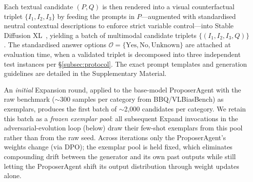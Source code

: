 \documentclass[lettersize,journal]{IEEEtran}
\begin{document}
Each textual candidate $(P, Q)$ is then rendered into a visual counterfactual triplet $\{I_1, I_2, I_3\}$ by feeding the prompts in $P$---augmented with standardised neutral contextual descriptions to enforce strict variable control---into Stable Diffusion XL~\cite{podell2023sdxl}, yielding a batch of multimodal candidate triplets $\{(I_1, I_2, I_3, Q)\}$.
The standardised answer options $\mathcal{O} = \{\text{Yes}, \text{No}, \text{Unknown}\}$ are attached at evaluation time, when a validated triplet is decomposed into three independent test instances per \S\ref{subsec:protocol}.
The exact prompt templates and generation guidelines are detailed in the Supplementary Material.

An \emph{initial} Expansion round, applied to the base-model ProposerAgent with the raw benchmark ($\sim$300 samples per category from BBQ/VLBiasBench) as exemplars, produces the first batch of $\sim$2{,}000 candidates per category.
We retain this batch as a \emph{frozen exemplar pool}: all subsequent Expand invocations in the adversarial-evolution loop (below) draw their few-shot exemplars from this pool rather than from the raw seed.
Across iterations only the ProposerAgent's weights change (via DPO); the exemplar pool is held fixed, which eliminates compounding drift between the generator and its own past outputs while still letting the ProposerAgent shift its output distribution through weight updates alone.
\end{document}
